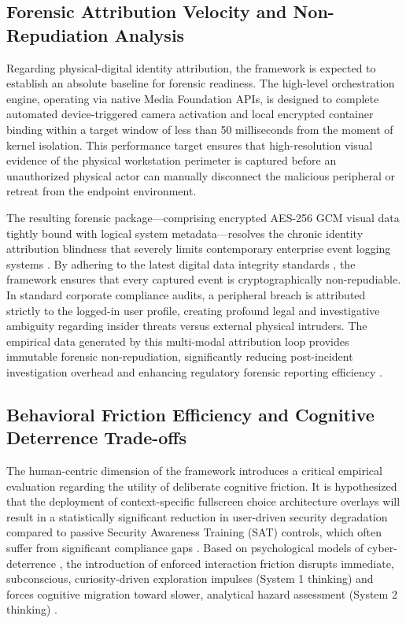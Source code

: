 \documentclass{ieeeaccess}
\begin{document}
\subsection{Forensic Attribution Velocity and Non-Repudiation Analysis}
Regarding physical-digital identity attribution, the framework is expected to establish an absolute baseline for forensic readiness. The high-level orchestration engine, operating via native Media Foundation APIs, is designed to complete automated device-triggered camera activation and local encrypted container binding within a target window of less than 50 milliseconds from the moment of kernel isolation. This performance target ensures that high-resolution visual evidence of the physical workstation perimeter is captured before an unauthorized physical actor can manually disconnect the malicious peripheral or retreat from the endpoint environment.

The resulting forensic package—comprising encrypted AES-256 GCM visual data tightly bound with logical system metadata—resolves the chronic identity attribution blindness that severely limits contemporary enterprise event logging systems \cite{ref21}. By adhering to the latest digital data integrity standards \cite{ref22}, the framework ensures that every captured event is cryptographically non-repudiable. In standard corporate compliance audits, a peripheral breach is attributed strictly to the logged-in user profile, creating profound legal and investigative ambiguity regarding insider threats versus external physical intruders. The empirical data generated by this multi-modal attribution loop provides immutable forensic non-repudiation, significantly reducing post-incident investigation overhead and enhancing regulatory forensic reporting efficiency \cite{ref23}.

\subsection{Behavioral Friction Efficiency and Cognitive Deterrence Trade-offs}
The human-centric dimension of the framework introduces a critical empirical evaluation regarding the utility of deliberate cognitive friction. It is hypothesized that the deployment of context-specific fullscreen choice architecture overlays will result in a statistically significant reduction in user-driven security degradation compared to passive Security Awareness Training (SAT) controls, which often suffer from significant compliance gaps \cite{ref24}. Based on psychological models of cyber-deterrence \cite{ref25}, the introduction of enforced interaction friction disrupts immediate, subconscious, curiosity-driven exploration impulses (System 1 thinking) and forces cognitive migration toward slower, analytical hazard assessment (System 2 thinking) \cite{ref26}.
\end{document}
